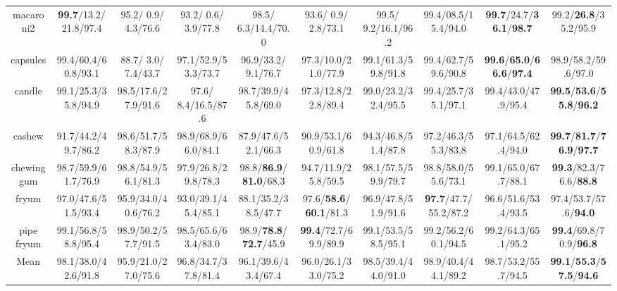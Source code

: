 \documentclass{article}
\theoremstyle{plain}
\theoremstyle{definition}
\theoremstyle{remark}
\begin{document}
\begin{table}[p]
{\begin{tabular}{ccccccccc>{\columncolor{oursblue}}c}
\cellcolor{rowgray} macaroni2 & \cellcolor{rowgray} \textbf{99.7}/13.2/21.8/97.4 & \cellcolor{rowgray} 95.2/ 0.9/ 4.3/76.6 & \cellcolor{rowgray} 93.2/ 0.6/ 3.9/77.8 & \cellcolor{rowgray} 98.5/ 6.3/14.4/70.0 & \cellcolor{rowgray} 93.6/ 0.9/ 2.8/73.1 & \cellcolor{rowgray} 99.5/ 9.2/16.1/96.2 & \cellcolor{rowgray} 99.4/08.5/15.4/94.0 & \cellcolor{rowgray} \textbf{99.7}/24.7/\textbf{36.1}/\textbf{98.7} & 99.2/\textbf{26.8}/35.2/95.9 \\
capsules    & 99.4/60.4/60.8/93.1 & 88.7/ 3.0/ 7.4/43.7 & 97.1/52.9/53.3/73.7 & 96.9/33.2/ 9.1/76.7 & 97.3/10.0/21.0/77.9 & 99.1/61.3/59.8/91.8 & 99.4/62.7/59.6/90.8 & \textbf{99.6}/\textbf{65.0}/\textbf{66.6}/\textbf{97.4} & 98.9/58.2/59.6/97.0 \\
\cellcolor{rowgray} candle & \cellcolor{rowgray} 99.1/25.3/35.8/94.9 & \cellcolor{rowgray} 98.5/17.6/27.9/91.6 & \cellcolor{rowgray} 97.6/ 8.4/16.5/87.6 & \cellcolor{rowgray} 98.7/39.9/45.8/69.0 & \cellcolor{rowgray} 97.3/12.8/22.8/89.4 & \cellcolor{rowgray} 99.0/23.2/32.4/95.5 & \cellcolor{rowgray} 99.4/25.7/35.1/97.1 & \cellcolor{rowgray} 99.4/43.0/47.9/95.4 & \textbf{99.5}/\textbf{53.6}/\textbf{55.8}/\textbf{96.2} \\
\midrule
cashew      & 91.7/44.2/49.7/86.2 & 98.6/51.7/58.3/87.9 & 98.9/68.9/66.0/84.1 & 87.9/47.6/52.1/66.3 & 90.9/53.1/60.9/61.8 & 94.3/46.8/51.4/87.8 & 97.2/46.3/55.3/83.8 & 97.1/64.5/62.4/94.0 & \textbf{99.7}/\textbf{81.7}/\textbf{76.9}/\textbf{97.7} \\
\cellcolor{rowgray} chewing gum & \cellcolor{rowgray} 98.7/59.9/61.7/76.9 & \cellcolor{rowgray} 98.8/54.9/56.1/81.3 & \cellcolor{rowgray} 97.9/26.8/29.8/78.3 & \cellcolor{rowgray} 98.8/\textbf{86.9}/\textbf{81.0}/68.3 & \cellcolor{rowgray} 94.7/11.9/25.8/59.5 & \cellcolor{rowgray} 98.1/57.5/59.9/79.7 & \cellcolor{rowgray} 98.8/58.0/55.6/73.1 & \cellcolor{rowgray} 99.1/65.0/67.7/88.1 & \textbf{99.3}/82.3/76.6/\textbf{88.8} \\
fryum       & 97.0/47.6/51.5/93.4 & 95.9/34.0/40.6/76.2 & 93.0/39.1/45.4/85.1 & 88.1/35.2/38.5/47.7 & 97.6/\textbf{58.6}/\textbf{60.1}/81.3 & 96.9/47.8/51.9/91.6 & \textbf{97.7}/47.7/55.2/87.2 & 96.6/51.6/53.4/93.5 & 97.4/53.7/57.6/\textbf{94.0} \\
\cellcolor{rowgray} pipe fryum & \cellcolor{rowgray} 99.1/56.8/58.8/95.4 & \cellcolor{rowgray} 98.9/50.2/57.7/91.5 & \cellcolor{rowgray} 98.5/65.6/63.4/83.0 & \cellcolor{rowgray} 98.9/\textbf{78.8}/\textbf{72.7}/45.9 & \cellcolor{rowgray} \textbf{99.4}/72.7/69.9/89.9 & \cellcolor{rowgray} 99.1/53.5/58.5/95.1 & \cellcolor{rowgray} 99.2/56.2/60.1/94.5 & \cellcolor{rowgray} 99.2/64.3/65.1/95.2 & \textbf{99.4}/69.8/70.9/\textbf{96.8} \\
\midrule
Mean        & 98.1/38.0/42.6/91.8 & 95.9/21.0/27.0/75.6 & 96.8/34.7/37.8/81.4 & 96.1/39.6/43.4/67.4 & 96.0/26.1/33.0/75.2 & 98.5/39.4/44.0/91.0 & 98.9/40.4/44.1/89.2 & 98.7/53.2/55.7/94.5 & \textbf{99.1}/\textbf{55.3}/\textbf{57.5}/\textbf{94.6} \\
\bottomrule
\end{tabular}
}
\end{table}
\end{document}

